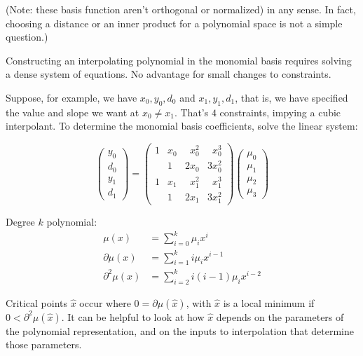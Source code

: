 (Note: these basis function aren't orthogonal or normalized)
in any
sense. In fact, choosing a distance or an inner product for
a polynomial space is not a simple question.)

Constructing an interpolating polynomial in the monomial basis
requires solving a dense system of equations. 
No advantage for small changes to constraints.

Suppose, for example, we have $x_0,y_0,d_0$ and
$x_1,y_1,d_1$, that is, we have specified the value and slope we
want at $x_0 \neq x_1$.
That's $4$ constraints, impying a cubic interpolant.
To determine the monomial basis coefficients,
solve the linear system:

\begin{equation}
\begin{pmatrix}
y_0 \\ d_0 \\ y_1 \\ d_1
\end{pmatrix}
=
\begin{pmatrix}
1 & x_0 & \phantom{2} x_0^2 & \phantom{3} x_0^3 \\
  & 1   & 2 x_0 & 3 x_0^2 \\
1 & x_1 & \phantom{2} x_1^2 & \phantom{3} x_1^3 \\
  & 1   & 2 x_1 & 3 x_1^2 
\end{pmatrix}
\begin{pmatrix}
\mu_0 \\ \mu_1 \\ \mu_2 \\ \mu_3
\end{pmatrix}
\end{equation}


Degree $k$ polynomial:
\begin{align}
\mu(x) & = \sum_{i=0}^{k} \mu_i x^i
\\
\partial{\mu}(x) & = \sum_{i=1}^{k} i \mu_i x^{i-1}
\nonumber
\\
\partial^2{\mu}(x) & = \sum_{i=2}^{k} i (i-1) \mu_i x^{i-2}
\nonumber
\end{align}

Critical points $\hat{x}$ occur where 
$ 0 = \partial{\mu}(\hat{x}) $,
with $\hat{x}$ is a local minimum if 
$ 0 < \partial^2{\mu}(\hat{x}) $.
It can be helpful to look at how $\hat{x}$ depends
on the parameters of the polynomial representation,
and on the inputs to interpolation that determine those 
parameters.

